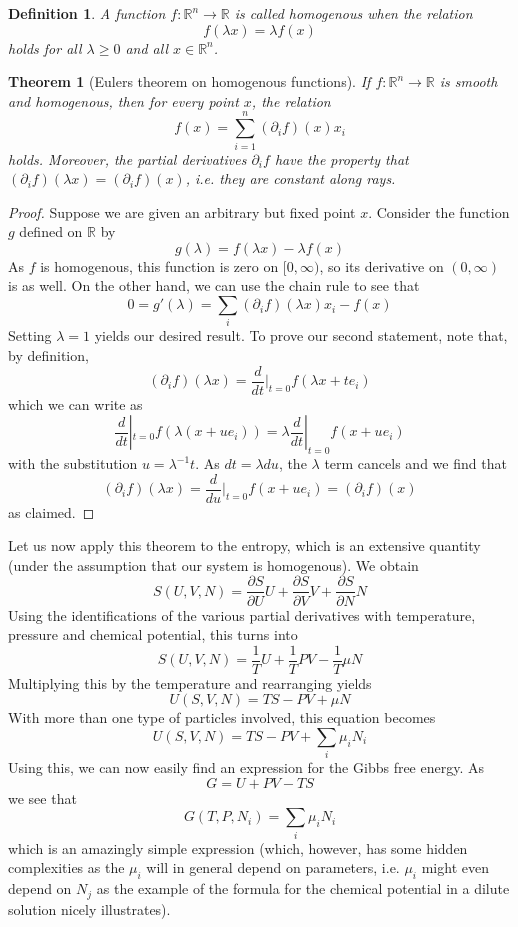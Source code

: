 \documentclass[a4paper, draft]{article}
\theoremstyle{own}
\newtheorem{thm}{Theorem}[section]
\newtheorem{defn}{Definition}[section]
\theoremstyle{remark}
\newcommand{\R}{\mathbb{R}}
\begin{document}
\begin{defn}
A function $f \colon \R^n \rightarrow \R$ is called {\em homogenous} when the relation
$$
f(\lambda x ) = \lambda f(x)
$$
holds for all $\lambda \geq 0$ and all $x \in \R^n$.
\end{defn}


\begin{thm}[Eulers theorem on homogenous functions]\label{thm:euler}
	If $f \colon \R^n \rightarrow \R$ is smooth and homogenous, then for every point $x$, the relation
	$$
	f(x) = \sum_{i=1}^n (\partial_i f)(x) x_i
	$$
	holds. Moreover, the partial derivatives $\partial_i f$ have the property that $(\partial_i f)(\lambda x) = (\partial_i f)(x)$, i.e. they are constant along rays.
\end{thm}


\begin{proof}
Suppose we are given an arbitrary but fixed point $x$. Consider the function $g$ defined on $\R$ by
$$
g(\lambda) = f(\lambda x) - \lambda f(x)
$$
As $f$ is homogenous, this function is zero on $[0, \infty)$, so its derivative on $(0, \infty)$ is as well. On the other hand, we can use the chain rule to see that
$$
0 = g'(\lambda) = \sum_i  (\partial_i f)(\lambda x) x_i - f(x)
$$
Setting $\lambda = 1$ yields our desired result. To prove our second statement, note that, by definition,
$$
(\partial_i f)(\lambda x) = \frac{d}{dt}|_{t=0} f(\lambda x + t e_i)
$$
which we can write as
$$
\frac{d}{dt}|_{t=0} f(\lambda (x + u e_i)) = \lambda \frac{d}{dt}|_{t=0} f(x + u e_i)
$$
with the substitution $u = \lambda^{-1} t$. As $dt = \lambda du$, the $\lambda$ term cancels and we find that 
$$
(\partial_i f)(\lambda x) = \frac{d}{du}|_{t=0} f(x + u e_i) = (\partial_i f)( x)
$$
as claimed.
\end{proof}

Let us now apply this theorem to the entropy, which is an extensive quantity (under the assumption that our system is homogenous). We obtain
$$
S(U, V, N) = \frac{\partial S}{\partial U} U + \frac{\partial S}{\partial V} V + \frac{\partial S}{\partial N} N
$$
Using the identifications of the various partial derivatives with temperature, pressure and chemical potential, this turns into
$$
S(U, V, N) = \frac{1}{T} U + \frac{1}{T} P V - \frac{1}{T} \mu N 
$$
Multiplying this by the temperature and rearranging yields
$$
U(S, V, N) = TS - PV + \mu N
$$
With more than one type of particles involved, this equation becomes
$$
U(S, V, N) = TS - PV + \sum_i \mu_i N_i
$$
Using this, we can now easily find an expression for the Gibbs free energy. As 
$$
G = U + PV - TS
$$
we see that
$$
G(T, P, N_i) = \sum_i \mu_i N_i
$$
which is an amazingly simple expression (which, however, has some hidden complexities as the $\mu_i$ will in general depend on parameters, i.e. $\mu_i$ might even depend on $N_j$ as the example of the formula for the chemical potential in a dilute solution nicely illustrates). 
\end{document}
